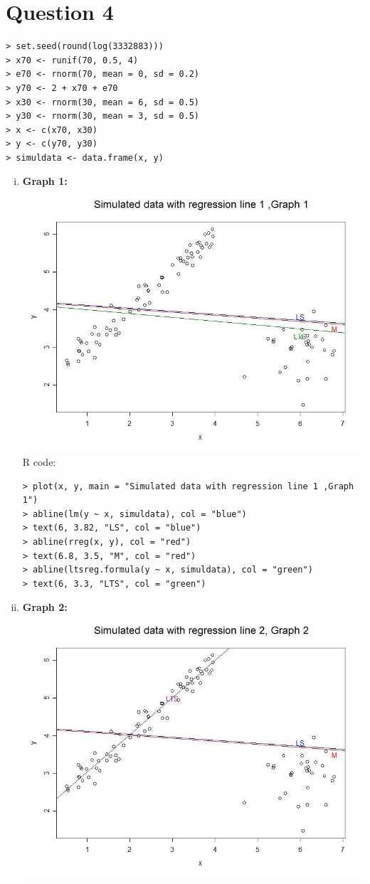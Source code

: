 \documentclass[a4paper,11pt]{article}
\begin{document}
\section*{Question 4}
\begin{verbatim}
> set.seed(round(log(3332883)))
> x70 <- runif(70, 0.5, 4)
> e70 <- rnorm(70, mean = 0, sd = 0.2)
> y70 <- 2 + x70 + e70
> x30 <- rnorm(30, mean = 6, sd = 0.5)
> y30 <- rnorm(30, mean = 3, sd = 0.5)
> x <- c(x70, x30)
> y <- c(y70, y30)
> simuldata <- data.frame(x, y)
\end{verbatim}
\begin{enumerate}[i)]
\item {\bf Graph 1:}\\
\includegraphics[scale=0.5]{g1.jpg}
\\R code:
\begin{verbatim}
> plot(x, y, main = "Simulated data with regression line 1 ,Graph 1")
> abline(lm(y ~ x, simuldata), col = "blue")
> text(6, 3.82, "LS", col = "blue")
> abline(rreg(x, y), col = "red")
> text(6.8, 3.5, "M", col = "red")
> abline(ltsreg.formula(y ~ x, simuldata), col = "green")
> text(6, 3.3, "LTS", col = "green")
\end{verbatim}
\newpage
\item {\bf Graph 2:}\\
\includegraphics[scale=0.5]{g2.jpg}

\end{enumerate}
\end{document}
